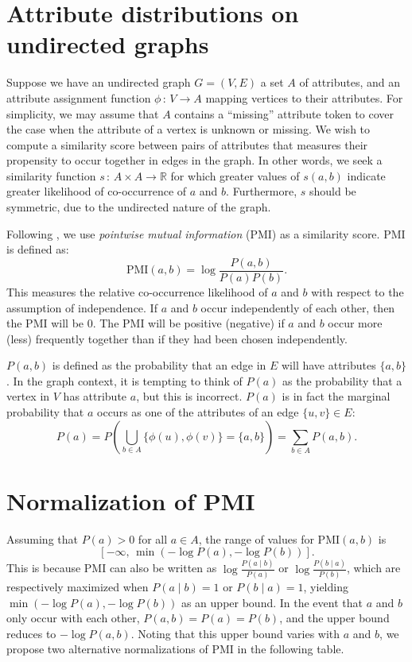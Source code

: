 \documentclass[11pt, oneside, fleqn]{article}   	%
\theoremstyle{plain}
\newcommand{\given}{\; | \;}
\newcommand{\st}{\, : \,}
\newcommand{\reals}{\mathbb{R}}
\begin{document}
\section{Attribute distributions on undirected graphs}
Suppose we have an undirected graph $G = (V, E)$ a set $A$ of attributes, and an attribute assignment function $\phi \st V \rightarrow A$ mapping vertices to their attributes.  For simplicity, we may assume that $A$ contains a ``missing'' attribute token to cover the case when the attribute of a vertex is unknown or missing.  We wish to compute a similarity score between pairs of attributes that measures their propensity to occur together in edges in the graph.  In other words, we seek a similarity function $s \st A \times A \rightarrow \reals$ for which greater values of $s(a, b)$ indicate greater likelihood of co-occurrence of $a$ and $b$.  Furthermore, $s$ should be symmetric, due to the undirected nature of the graph.

Following \cite{nameLocClustering}, we use \textit{pointwise mutual information} (PMI) as a similarity score.  PMI is defined as:
$$ \text{PMI}(a, b) = \log \frac{P(a, b)}{P(a) P(b)}. $$
This measures the relative co-occurrence likelihood of $a$ and $b$ with respect to the assumption of independence.  If $a$ and $b$ occur independently of each other, then the PMI will be 0.  The PMI will be positive (negative) if $a$ and $b$ occur more (less) frequently together than if they had been chosen independently.

$P(a, b)$ is defined as the probability that an edge in $E$ will have attributes $\{a, b\}$.  In the graph context, it is tempting to think of $P(a)$ as the probability that a vertex in $V$ has attribute $a$, but this is incorrect.  $P(a)$ is in fact the marginal probability that $a$ occurs as one of the attributes of an edge $\{u, v\} \in E$:
$$ P(a) = P \displaystyle \left ( \bigcup_{b \in A} \{\phi(u), \phi(v)\}= \{a, b\} \right ) = \sum_{b \in A} P(a, b). $$

\section{Normalization of PMI}
Assuming that $P(a) > 0$ for all $a \in A$, the range of values for PMI$(a, b)$ is
$$[-\infty, \, \min(-\log P(a), -\log P(b))]. $$
This is because PMI can also be written as $\log \frac{P(a \given b)}{P(a)}$ or $\log \frac{P(b \given a)}{P(b)}$, which are respectively maximized when $P(a \given b) = 1$ or $P(b \given a) = 1$, yielding $\min(-\log P(a), -\log P(b))$ as an upper bound.  In the event that $a$ and $b$ only occur with each other, $P(a, b) = P(a) = P(b)$, and the upper bound reduces to $-\log P(a, b)$.  Noting that this upper bound varies with $a$ and $b$, we propose two alternative normalizations of PMI in the following table.
\end{document}
